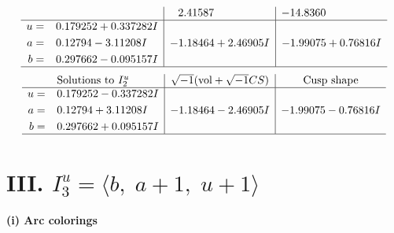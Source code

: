 \documentclass[1p]{elsarticle_modified}
\theoremstyle{definition}
\newcommand{\I}{\sqrt{-1}}
\begin{document}
$$\begin{array}{c|c|c}
 & \phantom{-}2.41587\phantom{ +0.000000I} & -14.8360\phantom{ +0.000000I} \\ \hline\begin{aligned}
u &= \phantom{-}0.179252 + 0.337282 I \\
a &= \phantom{-}0.12794 - 3.11208 I \\
b &= \phantom{-}0.297662 - 0.095157 I\end{aligned}
 & -1.18464 + 2.46905 I & -1.99075 + 0.76816 I\\
 \hline 
 \end{array}$$\newpage$$\begin{array}{c|c|c}  
\text{Solutions to }I^u_{2}& \I (\text{vol} + \sqrt{-1}CS) & \text{Cusp shape}\\
 \hline 
\begin{aligned}
u &= \phantom{-}0.179252 - 0.337282 I \\
a &= \phantom{-}0.12794 + 3.11208 I \\
b &= \phantom{-}0.297662 + 0.095157 I\end{aligned}
 & -1.18464 - 2.46905 I & -1.99075 - 0.76816 I\\
 \hline 
 \end{array}$$\newpage\newpage\renewcommand{\arraystretch}{1}
\centering \section*{III. $I^u_{3}= \langle b,\;a+1,\;u+1 \rangle$}
\flushleft \textbf{(i) Arc colorings}\\
\end{document}
